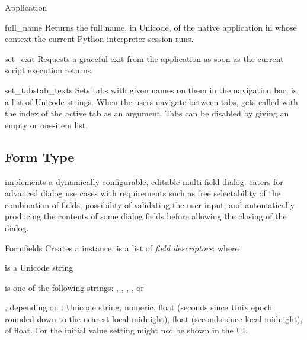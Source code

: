 \begin{classdesc*}{Application}
\begin{methoddesc}[Application]{full_name}{}
Returns the full name, in Unicode, of the native application in whose 
context the current Python interpreter session runs.
\end{methoddesc}

\begin{methoddesc}[Application]{set_exit}{}
Requests a graceful exit from the application as soon as the current script 
execution returns.
\end{methoddesc}

\begin{methoddesc}[Application]{set_tabs}{tab_texts}
Sets tabs with given names on them in the navigation bar; 
 is a list of Unicode strings. When the users 
navigate between tabs,  gets called with the index 
of the active tab as an argument. Tabs can be disabled by giving an empty or 
one-item  list.
\end{methoddesc}

\end{classdesc*}

\subsection{Form Type}
\label{subsec:form}
 implements a dynamically configurable, editable multi-field 
dialog.  caters for advanced dialog use cases with requirements 
such as free selectability of the combination of fields, possibility of 
validating the user input, and automatically producing the contents of some 
dialog fields before allowing the closing of the dialog. 

\begin{classdesc}{Form}{fields}
Creates a  instance.
 is a list of \emph{field descriptors}:  where

 is a Unicode string

 is one of the following strings: 
, , , , 
or 

, depending on : Unicode string, numeric, float (seconds 
since Unix epoch rounded down to the nearest local midnight), float (seconds 
since local midnight),  of float. For 
  the initial value setting might not be shown in the 
UI.
\end{classdesc}

